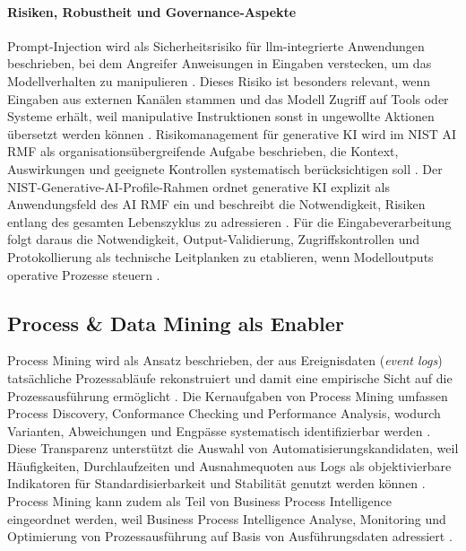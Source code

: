 \paragraph{Risiken, Robustheit und Governance-Aspekte}
Prompt-Injection wird als Sicherheitsrisiko für \gls{llm}-integrierte Anwendungen beschrieben, bei dem Angreifer Anweisungen in Eingaben verstecken, um das Modellverhalten zu manipulieren \cite{Liu2023PromptInjection}. 
Dieses Risiko ist besonders relevant, wenn Eingaben aus externen Kanälen stammen und das Modell Zugriff auf Tools oder Systeme erhält, weil manipulative Instruktionen sonst in ungewollte Aktionen übersetzt werden können \cite{Liu2023PromptInjection,OpenAIFunctionCalling}. 
Risikomanagement für generative KI wird im NIST AI RMF als organisationsübergreifende Aufgabe beschrieben, die Kontext, Auswirkungen und geeignete Kontrollen systematisch berücksichtigen soll \cite{NISTAIRMF1001}. 
Der NIST-Generative-AI-Profile-Rahmen ordnet generative KI explizit als Anwendungsfeld des AI RMF ein und beschreibt die Notwendigkeit, Risiken entlang des gesamten Lebenszyklus zu adressieren \cite{NISTGenAIProfile6001}. 
Für die Eingabeverarbeitung folgt daraus die Notwendigkeit, Output-Validierung, Zugriffskontrollen und Protokollierung als technische Leitplanken zu etablieren, wenn Modelloutputs operative Prozesse steuern \cite{NISTAIRMF1001,OpenAIStructuredOutputs}. 



\subsection{Process \& Data Mining als Enabler}
Process Mining wird als Ansatz beschrieben, der aus Ereignisdaten (\emph{event logs}) tatsächliche Prozessabläufe rekonstruiert und damit eine empirische Sicht auf die Prozessausführung ermöglicht \cite{Aalst2016ProcessMining}. 
Die Kernaufgaben von Process Mining umfassen Process Discovery, Conformance Checking und Performance Analysis, wodurch Varianten, Abweichungen und Engpässe systematisch identifizierbar werden \cite{Aalst2016ProcessMining}. 
Diese Transparenz unterstützt die Auswahl von Automatisierungskandidaten, weil Häufigkeiten, Durchlaufzeiten und Ausnahmequoten aus Logs als objektivierbare Indikatoren für Standardisierbarkeit und Stabilität genutzt werden können \cite{Aalst2016ProcessMining,AalstBichlerHeinzl2018RPA}. 
Process Mining kann zudem als Teil von Business Process Intelligence eingeordnet werden, weil Business Process Intelligence Analyse, Monitoring und Optimierung von Prozessausführung auf Basis von Ausführungsdaten adressiert \cite{Grigori2004BPI}. 

